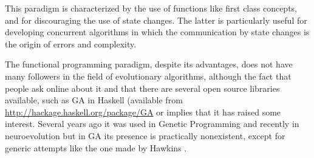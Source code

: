 
This paradigm is characterized by the use of functions like first
class concepts, and for discouraging the use of state changes. The
latter is particularly useful for developing concurrent algorithms in
which the communication by state changes is the origin of errors and
complexity.

The functional programming paradigm, despite its advantages, does not
have many followers in the field of evolutionary algorithms, although
the fact that people ask online about it \cite{haskell-ga} and that
there are several open source libraries available, such as GA in
Haskell (available from \url{http://hackage.haskell.org/package/GA} or
implies that it has raised
some interest. Several years ago it was used in Genetic
Programming
\cite{Briggs:2008:FGP:1375341.1375345,Huelsbergen:1996:TSE:1595536.1595579,walsh:1999:AFSFESIHLP}
and recently in neuroevolution \cite{Sher2013} but in GA its presence
is practically nonexistent, except for generic attempts like the one
made by Hawkins \cite{Hawkins:2001:GFG:872017.872197}. 

